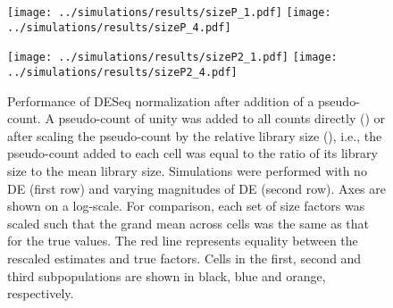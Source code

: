 \documentclass{article}
\begin{document}
\begin{figure}[p]
    \begin{center}
        \begin{minipage}{0.33\textwidth}
            \texttt{[image: ../simulations/results/sizeP\_1.pdf]}
            \texttt{[image: ../simulations/results/sizeP\_4.pdf]}
            \subcaption{}\label{subfig:size_prior}
        \end{minipage}
        \begin{minipage}{0.33\textwidth}
            \texttt{[image: ../simulations/results/sizeP2\_1.pdf]}
            \texttt{[image: ../simulations/results/sizeP2\_4.pdf]}
            \subcaption{}\label{subfig:size_libprior}
        \end{minipage}
    \end{center}
    \caption{
        Performance of DESeq normalization after addition of a pseudo-count.
        A pseudo-count of unity was added to all counts directly () or after scaling the pseudo-count by the relative library size (), i.e., the pseudo-count added to each cell was equal to the ratio of its library size to the mean library size.
        Simulations were performed with no DE (first row) and varying magnitudes of DE (second row).
        Axes are shown on a log-scale.
        For comparison, each set of size factors was scaled such that the grand mean across cells was the same as that for the true values.
        The red line represents equality between the rescaled estimates and true factors.
        Cells in the first, second and third subpopulations are shown in black, blue and orange, respectively.
    }
\end{figure}
\end{document}
